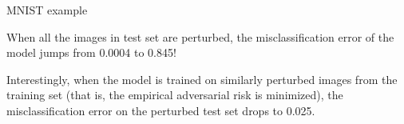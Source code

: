 \documentclass[11pt,compress,t,notes=noshow, xcolor=table]{beamer}
\begin{document}
\begin{vbframe} {MNIST example}
\begin{itemize}
      \item \small{When all the images in test set are perturbed, the misclassification error of the model jumps from 0.0004 to 0.845!
      \item Interestingly, when the model is trained on similarly perturbed images from the training set (that is, the empirical adversarial risk is minimized), the misclassification error on the perturbed test set drops to 0.025.}
    \end{itemize}
    \framebreak
  
  
  
\end{vbframe}


\end{document}
